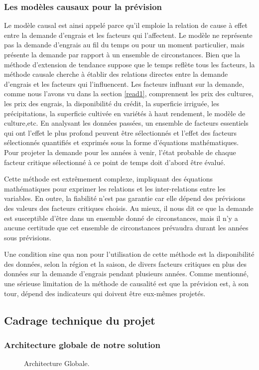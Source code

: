 	\subsubsection{Les modèles causaux pour la prévision}
	Le modèle causal est ainsi appelé parce qu'il emploie la relation de cause à effet entre la demande d'engrais et les facteurs qui l'affectent. Le modèle ne représente pas la demande d'engrais au fil du temps ou pour un moment particulier, mais présente la demande par rapport à un ensemble de circonstances. Bien que la méthode d'extension de tendance suppose que le temps reflète tous les facteurs, la méthode causale cherche à établir des relations directes entre la demande d'engrais et les facteurs qui l'influencent. Les facteurs influant sur la demande, comme nous l'avons vu dans la section \ref{read1}, comprennent les prix des cultures, les prix des engrais, la disponibilité du crédit, la superficie irriguée, les précipitations, la superficie cultivée en variétés à haut rendement, le modèle de culture,etc. En analysant les données passées, un ensemble de facteurs essentiels qui ont l'effet le plus profond peuvent être sélectionnés et l'effet des facteurs sélectionnés quantifiés et exprimés sous la forme d'équations mathématiques. Pour projeter la demande pour les années à venir, l'état probable de chaque facteur critique sélectionné à ce point de temps doit d'abord être évalué.
	
	Cette méthode est extrêmement complexe, impliquant des équations mathématiques pour exprimer les relations et les inter-relations entre les variables. En outre, la fiabilité n'est pas garantie car elle dépend des prévisions des valeurs des facteurs critiques choisis. Au mieux, il nous dit ce que la demande est susceptible d'être dans un ensemble donné de circonstances, mais il n'y a aucune certitude que cet ensemble de circonstances prévaudra durant les années sous prévisions.
	
	Une condition sine qua non pour l'utilisation de cette méthode est la disponibilité des données, selon la région et la saison, de divers facteurs critiques en plus des données sur la demande d'engrais pendant plusieurs années. Comme mentionné, une sérieuse limitation de la méthode de causalité est que la prévision est, à son tour, dépend des indicateurs qui doivent être eux-mêmes projetés.
	\subsection{Cadrage technique du projet}
	\subsubsection{Architecture globale de notre solution}
			\begin{figure}[H]
					\centering
					
					\label{fig:archi}
				\caption{Architecture Globale.}
			\end{figure}
